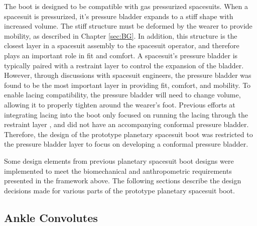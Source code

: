 \documentclass[defaultstyle,11pt]{comps}
\begin{document}
The boot is designed to be compatible with gas pressurized spacesuits.
When a spacesuit is pressurized, it's pressure bladder expands to a stiff shape with increased volume.
The stiff structure must be deformed by the wearer to provide mobility, as described in Chapter \ref{sec:BG}.
In addition, this structure is the closest layer in a spacesuit assembly to the spacesuit operator, and therefore plays an important role in fit and comfort.
A spacesuit's pressure bladder is typically paired with a restraint layer to control the expansion of the bladder\citep{Harris2001}.
However, through discussions with spacesuit engineers, the pressure bladder was found to be the most important layer in providing fit, comfort, and mobility.
To enable lacing compatibility, the pressure bladder will need to change volume, allowing it to properly tighten around the wearer's foot.
Previous efforts at integrating lacing into the boot only focused on running the lacing through the restraint layer \citep{Graziosi2016}, and did not have an accompanying conformal pressure bladder.
Therefore, the design of the prototype planetary spacesuit boot was restricted to the pressure bladder layer to focus on developing a conformal pressure bladder.

Some design elements from previous planetary spacesuit boot designs were implemented to meet the biomechanical and anthropometric requirements presented in the framework above.
The following sections describe the design decisions made for various parts of the prototype planetary spacesuit boot.

\hypertarget{ankle-convolutes}{%
\subsection{Ankle Convolutes}\label{ankle-convolutes}}
\end{document}
